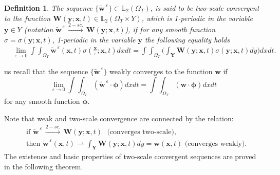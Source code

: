 \documentclass{article}
\theoremstyle{plain}
\theoremstyle{definition}
\newtheorem{definition}[theorem]{Definition}
\numberwithin{equation}{section}
\begin{document}
\begin{definition}\label{de4}
\emph{The sequence $\{\widetilde{\boldsymbol{w}}^{\,\varepsilon}\}\subset \mathbb{L}_{2}(\Omega_{T})$,
is said to be two-scale convergent to the function
$\boldsymbol{W}(\boldsymbol{y};\boldsymbol{x},t)\in \mathbb{L}_{2}(\Omega_{T}\times Y)$,
which is 1-periodic in the variable $\boldsymbol{y}\in Y$ (notation
$\widetilde{\boldsymbol{w}}^{\,\varepsilon}\,\stackrel{\!\!2-sc.}{\rightarrow}
\,\boldsymbol{W}(\boldsymbol{y};\boldsymbol{x},t)$),
if for any smooth function $\sigma=\sigma(\boldsymbol{y};\boldsymbol{x},t)$,
1-periodic in the variable $\boldsymbol{y}$ the following equality holds}
\begin{equation}\label{eq2.5}
\begin{aligned}
&
\lim_{{\varepsilon}\to 0}\int\int_{\Omega_{T}}\widetilde{\boldsymbol{w}}^{\,\varepsilon}(\boldsymbol{x},t) \sigma(\frac{\boldsymbol{x}}{\varepsilon};\boldsymbol{x},t)dxdt=
\int\int_{\Omega_{T}}\big(\int_{\textbf{Y}}\boldsymbol{W}(\boldsymbol{y};\boldsymbol{x},t)
\sigma(\boldsymbol{y};\boldsymbol{x},t)dy\big)dxdt.
\end{aligned}
\end{equation}
\end{definition}
 us recall that the sequence $\{\widetilde{\boldsymbol{w}}^{\,\varepsilon}\}$ weakly converges to the function $\boldsymbol{w}$ if
\begin{equation*}
\lim_{{\varepsilon}\to 0}\int\int_{\Omega_{T}}
(\widetilde{\boldsymbol{w}}^{\,\varepsilon}\cdot\boldsymbol{\phi})dxdt=
\int\int_{\Omega_{T}}(\boldsymbol{w}\cdot\boldsymbol{\phi})dxdt
\end{equation*} for any smooth function $\boldsymbol{\phi}$.

Note that weak and two-scale convergence are connected by the relation:
\begin{equation}\label{eq2.6}
\begin{aligned}
&
\mbox{if}\,\,\widetilde{\boldsymbol{w}}^{\,\varepsilon}\,\stackrel{\!\! 2-sc.}{\rightarrow}\,
\boldsymbol{W}(\boldsymbol{y};\boldsymbol{x},t)\,\,\,\,\mbox{(converges two-scale)},
\\
& \mbox{then}\,\,\widetilde{\boldsymbol{w}}^{\,\varepsilon}(\boldsymbol{x},t)
\rightharpoonup \int_{\textbf{Y}}\boldsymbol{W}(\boldsymbol{y};\boldsymbol{x},t) d{y}=\boldsymbol{w}(\boldsymbol{x},t)
\,\,\mbox{(converges weakly)}.
\end{aligned}
\end{equation}
The existence and basic properties of two-scale convergent sequences are proved in the following theorem.
\end{document}
